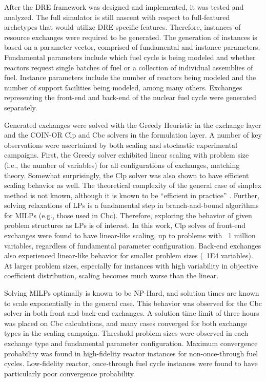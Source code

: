 After the DRE framework was designed and implemented, it was tested and
analyzed. The full \Cyclus simulator is still nascent with respect to
full-featured archetypes that would utilize DRE-specific features. Therefore,
instances of resource exchanges were required to be generated. The generation of
instances is based on a parameter vector, comprised of fundamental and instance
parameters. Fundamental parameters include which fuel cycle is being modeled and
whether reactors request single batches of fuel or a collection of individual
assemblies of fuel. Instance parameters include the number of reactors being
modeled and the number of support facilities being modeled, among many
others. Exchanges representing the front-end and back-end of the nuclear fuel
cycle were generated separately.

Generated exchanges were solved with the Greedy Heuristic in the exchange layer
and the COIN-OR Clp and Cbc solvers in the formulation layer. A number of key
observations were ascertained by both scaling and stochastic experimental
campaigns. First, the Greedy solver exhibited linear scaling with problem size
(i.e., the number of variables) for all configurations of exchanges, matching
theory. Somewhat surprisingly, the Clp solver was also shown to have efficient
scaling behavior as well. The theoretical complexity of the general case of
simplex method is not known, although it is known to be ``efficient in
practice'' \cite{goldfarb1994complexity}. Further, solving relaxations of LPs is
a fundamental step in branch-and-bound algorithms for MILPs (e.g., those used in
Cbc). Therefore, exploring the behavior of given problem structures as LPs is of
interest. In this work, Clp solves of front-end exchanges were found to have
linear-like scaling, up to problems with ~1 million variables, regardless of
fundamental parameter configuration. Back-end exchanges also experienced
linear-like behavior for smaller problem sizes (~1E4 variables). At larger
problem sizes, especially for instances with high variability in objective
coefficient distribution, scaling becomes much worse than the linear.

Solving MILPs optimally is known to be NP-Hard, and solution times are known to
scale exponentially in the general case. This behavior was observed for the Cbc
solver in both front and back-end exchanges. A solution time limit of three
hours was placed on Cbc calculations, and many cases converged for both exchange
types in the scaling campaign. Threshold problem sizes were observed in each
exchange type and fundamental parameter configuration. Maximum convergence
probability was found in high-fidelity reactor instances for non-once-through
fuel cycles. Low-fidelity reactor, once-through fuel cycle instances were found
to have particularly poor convergence probability. 

